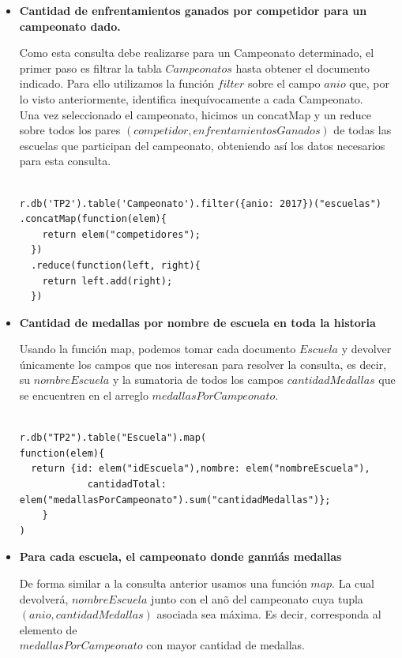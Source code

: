 \begin{itemize}

\item{\textbf{Cantidad de enfrentamientos ganados por competidor para un campeonato dado.}

Como esta consulta debe realizarse para un Campeonato determinado, el primer paso es filtrar la tabla $Campeonatos$ hasta obtener el documento indicado. Para ello utilizamos la función $filter$ sobre el campo $anio$ que, por lo visto anteriormente, identifica inequívocamente a cada Campeonato.\\

Una vez seleccionado el campeonato, hicimos un concatMap y un reduce sobre todos los pares $(competidor,enfrentamientosGanados)$ de todas las escuelas que participan del campeonato, obteniendo así los datos necesarios para esta consulta.

\begin{verbatim}

r.db('TP2').table('Campeonato').filter({anio: 2017})("escuelas")
.concatMap(function(elem){
  	return elem("competidores");
  })
  .reduce(function(left, right){
    return left.add(right);
  })

\end{verbatim}
}

\item{\textbf{Cantidad de medallas por nombre de escuela en toda la historia}

Usando la función map, podemos tomar cada documento $Escuela$ y devolver únicamente los campos que nos interesan para resolver la consulta, es decir, su $nombreEscuela$ y la sumatoria de todos los campos $cantidadMedallas$ que se encuentren en el arreglo $medallasPorCampeonato$.

\begin{verbatim}

r.db("TP2").table("Escuela").map(
function(elem){
  return {id: elem("idEscuela"),nombre: elem("nombreEscuela"),
    		cantidadTotal: elem("medallasPorCampeonato").sum("cantidadMedallas")};
	}
)

\end{verbatim}
}

\item{\textbf{Para cada escuela, el campeonato donde gan\' m\'as medallas}

De forma similar a la consulta anterior usamos una función $map$. La 
cual devolverá, $nombreEscuela$ junto con el an\~o del campeonato cuya tupla\\
 $(anio,cantidadMedallas)$ asociada sea máxima. Es decir, corresponda al 
 elemento de \\$medallasPorCampeonato$ con mayor cantidad de medallas.

}
\end{itemize}
